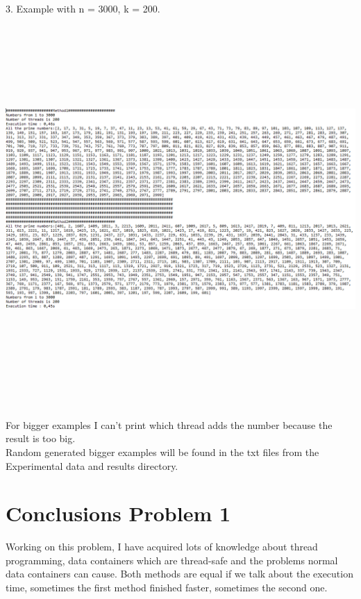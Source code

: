 \documentclass[14pt]{article}
\begin{document}
\begin{center}
3. Example with n = 3000, k = 200.
\vspace{10mm}

\includegraphics[height=5.5in, width = 6in]{3000200.png}\\
\end{center}\\
For bigger examples I can't print which thread adds the number because the result is too big.\\
Random generated bigger examples will be found in the txt files from the Experimental data and results directory.


\section*{Conclusions Problem 1}
\vspace{10 mm}
Working on this problem, I have acquired lots of knowledge about thread programming, data containers which are thread-safe and the problems normal data containers can cause. Both methods are equal if we talk about the execution time, sometimes the first method finished faster, sometimes the second one.  
\newpage
\end{document}
